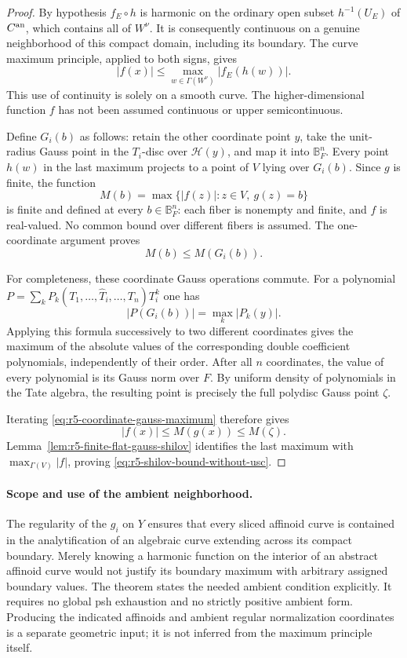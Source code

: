 \documentclass[11pt,a4paper]{article}
\numberwithin{equation}{section}
\theoremstyle{definition}
\theoremstyle{remark}
\begin{document}
\begin{proof}
By hypothesis $f_E\circ h$ is harmonic on the ordinary open
subset $h^{-1}(U_E)$ of $C^{\rm an}$, which contains all of
$W^\nu$.  It is consequently continuous on a genuine
neighborhood of this compact domain, including its boundary.
The curve maximum principle, applied to both signs, gives
\[
 |f(x)|\leq\max_{w\in\Gamma(W^\nu)}|f_E(h(w))|.
\]
This use of continuity is solely on a smooth curve.  The
higher-dimensional function $f$ has not been assumed continuous
or upper semicontinuous.

Define $G_i(b)$ as follows: retain the other coordinate point $y$,
take the unit-radius Gauss point in the $T_i$-disc over
$\mathscr H(y)$, and map it into $\mathbb B_F^n$.  Every point
$h(w)$ in the last maximum projects to a point of $V$ lying
over $G_i(b)$.  Since $g$ is finite, the function
\[
 M(b)=\max\{|f(z)|:z\in V,\ g(z)=b\}
\]
is finite and defined at every $b\in\mathbb B_F^n$: each fiber
is nonempty and finite, and $f$ is real-valued. No common bound
over different fibers is assumed. The one-coordinate
argument proves
\begin{equation}
                              M(b)\leq M(G_i(b)).
 \label{eq:r5-coordinate-gauss-maximum}
\end{equation}

For completeness, these coordinate Gauss operations commute.
For a polynomial $P=\sum_k P_k(T_1,\ldots,\widehat T_i,\ldots,T_n)T_i^k$
one has
\[
                         |P(G_i(b))|=\max_k|P_k(y)|.
\]
Applying this formula successively to two different coordinates
gives the maximum of the absolute values of the corresponding
double coefficient polynomials, independently of their order.
After all $n$ coordinates, the value of every polynomial is its
Gauss norm over $F$.  By uniform density of polynomials in the
Tate algebra, the resulting point is precisely the full polydisc
Gauss point $\zeta$.

Iterating \eqref{eq:r5-coordinate-gauss-maximum} therefore gives
\[
                   |f(x)|\leq M(g(x))\leq M(\zeta).
\]
Lemma~\ref{lem:r5-finite-flat-gauss-shilov} identifies the last
maximum with $\max_{\Gamma(V)}|f|$, proving
\eqref{eq:r5-shilov-bound-without-usc}.
\end{proof}

\paragraph{Scope and use of the ambient neighborhood.}
The regularity of the $g_i$ on $Y$ ensures that every sliced
affinoid curve is contained in the analytification of an algebraic
curve extending across its compact boundary.  Merely knowing a
harmonic function on the interior of an abstract affinoid curve
would not justify its boundary maximum with arbitrary assigned
boundary values.  The theorem states the needed ambient condition
explicitly.  It requires no global psh exhaustion and no strictly
positive ambient form.  Producing the indicated affinoids and
ambient regular normalization coordinates is a separate geometric
input; it is not inferred from the maximum principle itself.
\end{document}
